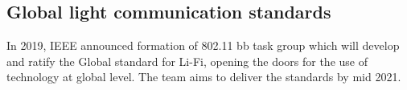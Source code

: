 \documentclass{article}
\begin{document}
\subsection{Global light communication standards}
In 2019, IEEE announced formation of 802.11 bb task group which will develop and ratify the Global standard for Li-Fi, opening the doors for the use of technology at global level. The team aims to deliver the standards by mid 2021.

\printbibliography
\end{document}
